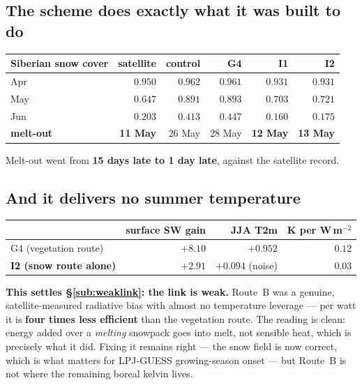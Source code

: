 \documentclass[10pt]{article}
\begin{document}
\subsection{The scheme does exactly what it was built to do}\label{sub:r15works}
\begin{center}\footnotesize
\begin{tabular}{l r r r r r}
\toprule
Siberian snow cover & satellite & control & G4 & \textbf{I1} & \textbf{I2} \\
\midrule
Apr & $0.950$ & $0.962$ & $0.961$ & $0.931$ & $0.931$ \\
May & $0.647$ & $0.891$ & $0.893$ & $\mathbf{0.703}$ & $\mathbf{0.721}$ \\
Jun & $0.203$ & $0.413$ & $0.447$ & $\mathbf{0.160}$ & $\mathbf{0.175}$ \\
\midrule
\textbf{melt-out} & \textbf{11 May} & 26 May & 28 May & \textbf{12 May} & \textbf{13 May} \\
\bottomrule
\end{tabular}
\end{center}
\noindent Melt-out went from \textbf{15 days late to 1 day late}, against the satellite record.

\subsection{And it delivers no summer temperature}\label{sub:r15notemp}
\begin{center}\footnotesize
\begin{tabular}{l r r r}
\toprule
 & surface SW gain & JJA T2m & K per W\,m$^{-2}$ \\
\midrule
G4 (vegetation route) & $+8.10$ & $\mathbf{+0.952}$ & $0.12$ \\
\textbf{I2 (snow route alone)} & $+2.91$ & $\mathbf{+0.094}$ (noise) & $\mathbf{0.03}$ \\
\bottomrule
\end{tabular}
\end{center}

\noindent \textbf{This settles \S\ref{sub:weaklink}: the link is weak.} Route~B was a genuine,
satellite-measured radiative bias with almost no temperature leverage --- per watt it is
\textbf{four times less efficient} than the vegetation route. The reading is clean: energy
added over a \emph{melting} snowpack goes into melt, not sensible heat, which is precisely
what it did. Fixing it remains right --- the snow field is now correct, which is what matters
for LPJ-GUESS growing-season onset --- but Route~B is not where the remaining boreal kelvin
lives.
\end{document}
